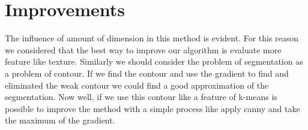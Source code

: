 \documentclass[10pt,twocolumn,letterpaper]{article}
\begin{document}
\section{Improvements}
The influence of amount of dimension in this method is evident. For this reason we considered that the best way to improve our algorithm is evaluate more feature like texture. Similarly we should consider the problem of segmentation as a problem of contour. If we find the contour and use the gradient to find and eliminated the weak contour we could find a good approximation of the segmentation. Now well, if we use this contour like a feature of k-means is possible to improve the method with a simple process like apply canny and take the maximum of the gradient.

\nocite{*}


\end{document}
